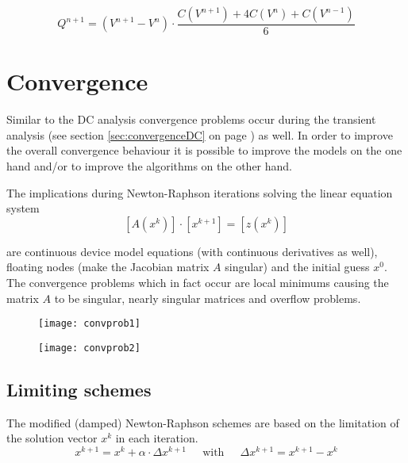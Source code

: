 \begin{equation}
Q^{n+1} = \left(V^{n+1} - V^{n}\right)\cdot \dfrac{C(V^{n+1}) + 4 C(V^{n}) + C(V^{n-1})}{6}
\end{equation}

\section{Convergence}

Similar to the DC analysis convergence problems occur during the
transient analysis (see section \ref{sec:convergenceDC} on page
\pageref{sec:convergenceDC}) as well.  In order to improve the overall
convergence behaviour it is possible to improve the models on the one
hand and/or to improve the algorithms on the other hand.

\addvspace{12pt}

The implications during Newton-Raphson iterations solving the linear
equation system
\begin{equation}
\left[A\left(x^k\right)\right] \cdot \left[x^{k+1}\right] = \left[z\left(x^k\right)\right]
\end{equation}

are continuous device model equations (with continuous derivatives as
well), floating nodes (make the Jacobian matrix $A$ singular) and the
initial guess $x^0$.  The convergence problems which in fact occur are
local minimums causing the matrix $A$ to be singular, nearly singular
matrices and overflow problems.

\begin{figure}[ht]
\begin{center}
\texttt{[image: convprob1]}
\end{center}
\label{fig:ConvProb1}
\end{figure}
\FloatBarrier

\begin{figure}[ht]
\begin{center}
\texttt{[image: convprob2]}
\end{center}
\label{fig:ConvProb2}
\end{figure}
\FloatBarrier

\subsection{Limiting schemes}

The modified (damped) Newton-Raphson schemes are based on the
limitation of the solution vector $x^k$ in each iteration.
\begin{equation}
x^{k+1} = x^k + \alpha\cdot \Delta x^{k+1}
\;\;\;\; \textrm{ with } \;\;\;\;
\Delta x^{k+1} = x^{k+1} - x^k
\end{equation}

